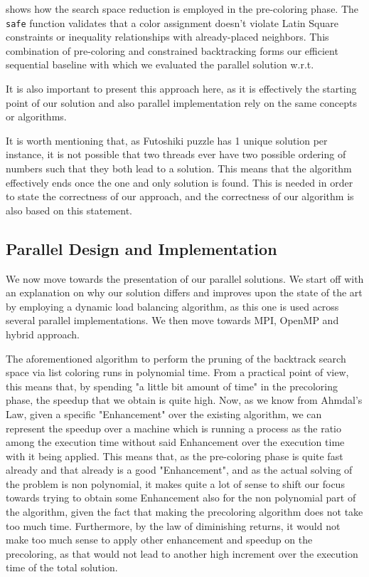  shows how the search space reduction is employed in the pre-coloring phase. The \texttt{safe} function validates that a color assignment doesn't violate Latin Square constraints or inequality relationships with already-placed neighbors. This combination of pre-coloring and constrained backtracking forms our efficient sequential baseline with which we evaluated the parallel solution w.r.t.

It is also important to present this approach here, as it is effectively the starting point of our solution and also parallel implementation rely on the same concepts or algorithms.

It is worth mentioning that, as Futoshiki puzzle has 1 unique solution per instance, it is not possible that two threads ever have two possible ordering of numbers such that they both lead to a solution. This means that the algorithm effectively ends once the one and only solution is found. This is needed in order to state the correctness of our approach, and the correctness of our algorithm is also based on this statement.

\subsection{Parallel Design and Implementation}
\label{subsec:parallel_implementation}
We now move towards the presentation of our parallel solutions. We start off with an explanation on why our solution differs and improves upon the state of the art by employing a dynamic load balancing algorithm, as this one is used across several parallel implementations. We then move towards MPI, OpenMP and hybrid approach. 

The aforementioned algorithm to perform the pruning of the backtrack search space via list coloring runs in polynomial time. From a practical point of view, this means that, by spending "a little bit amount of time" in the precoloring phase, the speedup that we obtain is quite high. Now, as we know from Ahmdal's Law, given a specific "Enhancement" over the existing algorithm, we can represent the speedup over a machine which is running a process as the ratio among the execution time without said Enhancement over the execution time with it being applied. This means that, as the pre-coloring phase is quite fast already and that already is a good "Enhancement", and as the actual solving of the problem is non polynomial, it makes quite a lot of sense to shift our focus towards trying to obtain some Enhancement also for the non polynomial part of the algorithm, given the fact that making the precoloring algorithm does not take too much time. Furthermore, by the law of diminishing returns, it would not make too much sense to apply other enhancement and speedup on the precoloring, as that would not lead to another high increment over the execution time of the total solution.

